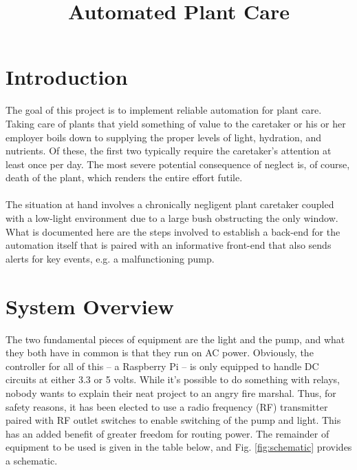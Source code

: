 \documentclass[]{article}
\title{Automated Plant Care}
\date{}
\begin{document}
\maketitle


\section{Introduction}
The goal of this project is to implement reliable automation for plant care.  Taking care of plants that yield something of value to the caretaker or his or her employer boils down to supplying the proper levels of light, hydration, and nutrients.  Of these, the first two typically require the caretaker's attention at least once per day.  The most severe potential consequence of neglect is, of course, death of the plant, which renders the entire effort futile.
\\\\
The situation at hand involves a chronically negligent plant caretaker coupled with a low-light environment due to a large bush obstructing the only window.  What is documented here are the steps involved to establish a back-end for the automation itself that is paired with an informative front-end that also sends alerts for key events, e.g. a malfunctioning pump.

\section{System Overview}
The two fundamental pieces of equipment are the light and the pump, and what they both have in common is that they run on AC power.  Obviously, the controller for all of this -- a Raspberry Pi -- is only equipped to handle DC circuits at either 3.3 or 5 volts.  While it's possible to do something with relays, nobody wants to explain their neat project to an angry fire marshal.  Thus, for safety reasons, it has been elected to use a radio frequency (RF) transmitter paired with RF outlet switches to enable switching of the pump and light.  This has an added benefit of greater freedom for routing power.  The remainder of equipment to be used is given in the table below, and Fig. \ref{fig:schematic} provides a schematic.
\end{document}
